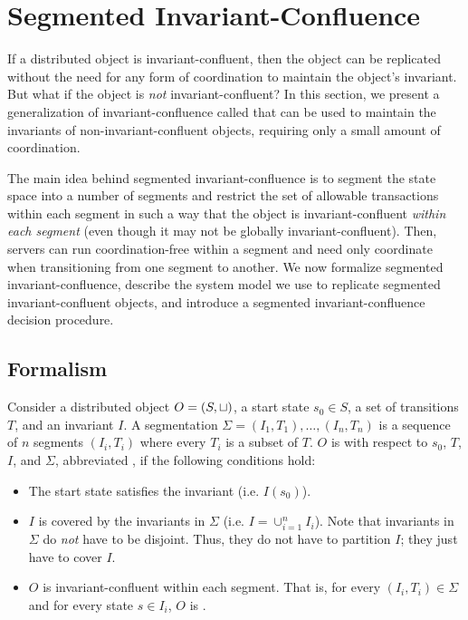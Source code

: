 \section{Segmented Invariant-Confluence}
\newcommand{\IsIclosed}{\textsf{IsIclosed}}

If a distributed object is invariant-confluent, then the object can be
replicated without the need for any form of coordination to maintain the
object's invariant. But what if the object is \emph{not} invariant-confluent?
In this section, we present a generalization of invariant-confluence called
 that can be used to maintain the
invariants of non-invariant-confluent objects, requiring only a small amount of
coordination.

The main idea behind segmented invariant-confluence is to segment the state
space into a number of segments and restrict the set of allowable transactions
within each segment in such a way that the object is invariant-confluent
\emph{within each segment} (even though it may not be globally
invariant-confluent). Then, servers can run coordination-free within a segment
and need only coordinate when transitioning from one segment to another. We now
formalize segmented invariant-confluence, describe the system model we use to
replicate segmented invariant-confluent objects, and introduce a segmented
invariant-confluence decision procedure.

\subsection{Formalism}
Consider a distributed object $O = (S, \sqcup)$, a start state $s_0 \in S$, a
set of transitions $T$, and an invariant $I$. A segmentation $\Sigma = (I_1,
T_1), \ldots, (I_n, T_n)$ is a sequence of $n$ segments $(I_i, T_i)$ where
every $T_i$ is a subset of $T$. $O$ is 
with respect to $s_0$, $T$, $I$, and $\Sigma$, abbreviated
, if the following conditions hold:
\begin{itemize}
  \item
    The start state satisfies the invariant (i.e. $I(s_0)$).

  \item
    $I$ is covered by the invariants in $\Sigma$ (i.e. $I = \cup_{i=1}^n I_i$).
    Note that invariants in $\Sigma$ do \emph{not} have to be disjoint. Thus,
    they do not have to partition $I$; they just have to cover $I$.

  \item
    $O$ is invariant-confluent within each segment. That is, for every $(I_i,
    T_i) \in \Sigma$ and for every state $s \in I_i$, $O$ is
    .
\end{itemize}

